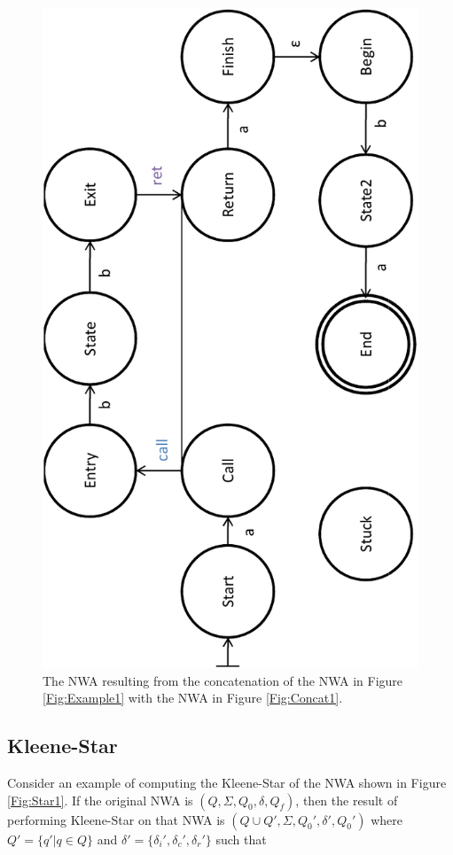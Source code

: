 \begin{figure}[p]
  \centering
    \includegraphics[width=12cm]{Figures/Figure10}
  \caption{The NWA resulting from the concatenation of the NWA in Figure
    \ref{Fig:Example1} with the NWA in Figure \ref{Fig:Concat1}.}
  \label{Fig:Concat2}
\end{figure}


\subsection{Kleene-Star}
\label{Se:Star}

Consider an example of computing the Kleene-Star of the NWA shown in Figure
\ref{Fig:Star1}.  If the original NWA is $(Q, \Sigma, Q_0, \delta, Q_f)$,
then the result of performing Kleene-Star on that NWA is $(Q \cup Q', \Sigma,
Q_0', \delta', Q_0')$ where $Q' = \{q' | q \in Q\}$ and $\delta' =
\{\delta_i',\delta_c',\delta_r'\}$ such that


